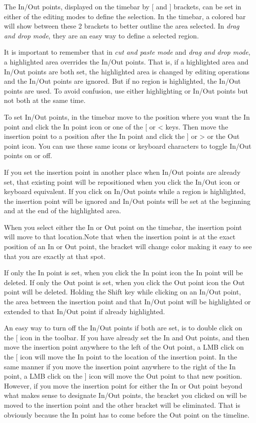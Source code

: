 The In/Out points, displayed on the timebar by [ and ] brackets,  can be set in either of the editing modes to define the selection.
In the timebar, a colored bar will show between these 2 brackets to better outline the area selected.
In \emph{drag and drop mode}, they are an easy way to define a selected region.

It is important to remember that in \emph{cut and paste mode} and \emph{drag and drop mode}, a highlighted area 
overrides the In/Out points. That is, if a highlighted area and In/Out points are both set, the highlighted area is changed by editing operations and the In/Out points are ignored. 
But if no region is highlighted, the In/Out points are used. 
To avoid confusion, use either highlighting or In/Out points but not both at the same time.

To set In/Out points, in the timebar move to the position where you want the In point and click the In
point icon or one of the [ or < keys.
Then move the insertion point to a position after the In point and click the ] or > or the Out point icon. 
You can use these same icons or keyboard characters to toggle In/Out points on or off.

If you set the insertion point in another place when In/Out points are already set, that existing point will be
repositioned when you click the In/Out icon or keyboard equivalent. 
If you click on In/Out points while a region is highlighted, the insertion point will be ignored and In/Out points will be set at the beginning and at the end of the highlighted area.

When you select either the In or Out point on the timebar, the insertion point will move to that location.Note that when the insertion point is at the exact position of an In or Out point, the bracket will change
color making it easy to see that you are exactly at that spot.
 
If only the In point is set, when you click the In point icon the In point will be deleted. 
If only the Out point is set, when you click the Out point icon the Out point will be deleted. 
Holding the Shift key while clicking on an In/Out point, the area between the insertion point and that
In/Out point will be highlighted or extended to that In/Out point if already highlighted. 

An easy way to turn off the In/Out points if both are set, is to double click on the [ icon in the toolbar. 
If you have already set the In and Out points, and then move the insertion point anywhere to the left of
the Out point, a LMB click on the [ icon will move the In point to the location of the insertion point.  In the same
manner if you move the insertion point anywhere to the right of the In point, a LMB click on the ] icon
will move the Out point to that new position.  However, if you move the insertion point for either the
In or Out point beyond what makes sense to designate In/Out points, the bracket you clicked on will be
moved to the insertion point and the other bracket will be eliminated.  That is obviously because the
In point has to come before the Out point on the timeline.

